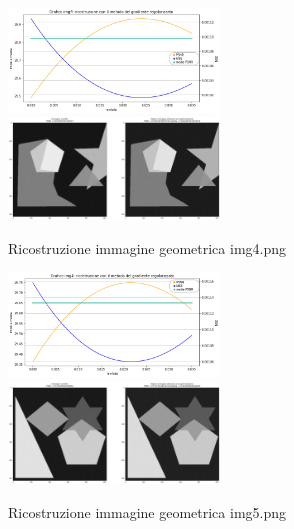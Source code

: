 \begin{figure}[H]
    \includegraphics[width=0.5\textwidth]{IMMAGINI_RELAZIONE/grafico4Tik.png}
    \includegraphics[width=0.5\textwidth]{IMMAGINI_RELAZIONE/ricostruzione4Tik.png}
    \caption{Ricostruzione immagine geometrica img4.png}

    \includegraphics[width=0.5\textwidth]{IMMAGINI_RELAZIONE/grafico5Tik.png}
    \includegraphics[width=0.5\textwidth]{IMMAGINI_RELAZIONE/ricostruzione5Tik.png}
    \caption{Ricostruzione immagine geometrica img5.png}
\end{figure}

